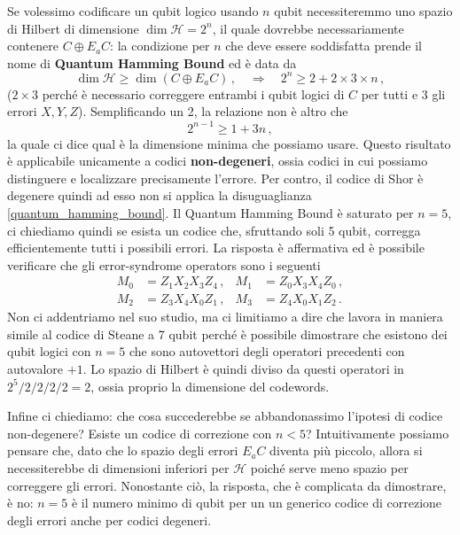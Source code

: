 \noindent Se volessimo codificare un qubit logico usando $n$ qubit necessiteremmo uno spazio di Hilbert di dimensione $\dim \mathcal{H}=2^n$, il quale dovrebbe necessariamente contenere $C \oplus E_aC$: la condizione per $n$ che deve essere soddisfatta prende il nome di \textbf{Quantum Hamming Bound} ed è data da
\begin{equation*}
    \dim \mathcal{H} \geq \dim (C \oplus E_a C) \, , \quad \Rightarrow \quad 2^n \geq 2 + 2 \times 3 \times n \, ,
\end{equation*}
($2 \times 3$ perché è necessario correggere entrambi i qubit logici di $C$ per tutti e 3 gli errori $X, Y, Z$). Semplificando un 2, la relazione non è altro che 
\begin{equation}\label{quantum_hamming_bound}
    2^{n-1}\geq 1+3n \, ,
\end{equation}
la quale ci dice qual è la dimensione minima che possiamo usare. Questo risultato è applicabile unicamente a codici \textbf{non-degeneri}, ossia codici in cui possiamo distinguere e localizzare precisamente l'errore. Per contro, il codice di Shor è degenere quindi ad esso non si applica la disuguaglianza \eqref{quantum_hamming_bound}. 
Il Quantum Hamming Bound è saturato per $n=5$, ci chiediamo quindi se esista un codice che, sfruttando soli 5 qubit, corregga efficientemente tutti i possibili errori. La risposta è affermativa ed è possibile verificare che gli error-syndrome operators sono i seguenti
\begin{align*}
    M_0 &= Z_1X_2X_3Z_4 \, , &M_1 &= Z_0 X_3 X_4 Z_0 \, , \\
    M_2 &= Z_3X_4X_0Z_1 \, , &M_3 &= Z_4X_0X_1Z_2 \, .
\end{align*}
Non ci addentriamo nel suo studio, ma ci limitiamo a dire che lavora in maniera simile al codice di Steane a 7 qubit perché è possibile dimostrare che esistono dei qubit logici con $n=5$ che sono autovettori degli operatori precedenti con autovalore $+1$. Lo spazio di Hilbert è quindi diviso da questi operatori in $2^5/2/2/2/2 = 2$, ossia proprio la dimensione del codewords. 

\noindent Infine ci chiediamo: che cosa succederebbe se abbandonassimo l'ipotesi di codice non-degenere? Esiste un codice di correzione con $n < 5$? Intuitivamente possiamo pensare che, dato che lo spazio degli errori $E_a C$ diventa più piccolo, allora si necessiterebbe di dimensioni inferiori per $\mathcal{H}$ poiché serve meno spazio per correggere gli errori. Nonostante ciò, la risposta, che è complicata da dimostrare, è no: $n = 5$ è il numero minimo di qubit per un un generico codice di correzione degli errori anche per codici degeneri. 
